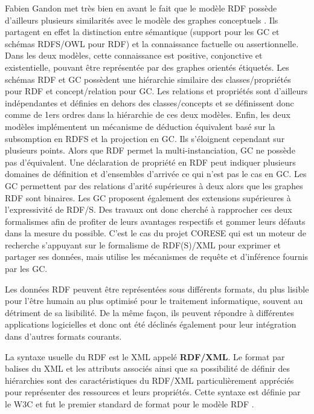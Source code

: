 Fabien Gandon met très bien en avant le fait que le modèle RDF possède d'ailleurs plusieurs similarités avec le modèle des graphes conceptuels \cite{gandon_graphes_2008}. Ils partagent en effet la distinction entre sémantique (support pour les GC et schémas RDFS/OWL pour RDF) et la connaissance factuelle ou assertionnelle. Dans les deux modèles, cette connaissance est positive, conjonctive et existentielle, pouvant être représentée par des graphes orientés étiquetés. Les schémas RDF et GC possèdent une hiérarchie similaire des classes/propriétés pour RDF et concept/relation pour GC. Les relations et propriétés sont d'ailleurs indépendantes et définies en dehors des classes/concepts et se définissent donc comme de 1ers ordres dans la hiérarchie de ces deux modèles. Enfin, les deux modèles implémentent un mécanisme de déduction équivalent basé sur la subsomption en RDFS et la projection en GC. Ils s'éloignent cependant sur plusieurs points. Alors que RDF permet la multi-instanciation, GC ne possède pas d'équivalent. Une déclaration de propriété en RDF peut indiquer plusieurs domaines de définition et d'ensembles d'arrivée ce qui n'est pas le cas en GC. Les GC permettent par des relations d'arité supérieures à deux alors que les graphes RDF sont binaires. Les GC proposent également des extensions supérieures à l'expressivité de RDF/S.
Des travaux ont donc cherché à rapprocher ces deux formalismes afin de profiter de leurs avantages respectifs et gommer leurs défauts dans la mesure du possible. C'est le cas du projet CORESE \cite{corby_searching_2006} qui est un moteur de recherche s'appuyant sur le formalisme de RDF(S)/XML pour exprimer et partager ses données, mais utilise les mécanismes de requête et d'inférence fournis par les GC. 


Les données RDF peuvent être représentées sous différents formats, du plus lisible pour l'être humain au plus optimisé pour le traitement informatique, souvent au détriment de sa lisibilité. De la même façon, ils peuvent répondre à différentes applications logicielles et donc ont été déclinés également pour leur intégration dans d'autres formats courants.

La syntaxe usuelle du RDF est le XML appelé \textbf{RDF/XML}. Le format par balises du XML et les attributs associés ainsi que sa possibilité de définir des hiérarchies sont des caractéristiques du RDF/XML particulièrement appréciés pour représenter des ressources et leurs propriétés. Cette syntaxe est définie par le W3C et fut le premier standard de format pour le modèle RDF \cite{beckett2004rdf}.

